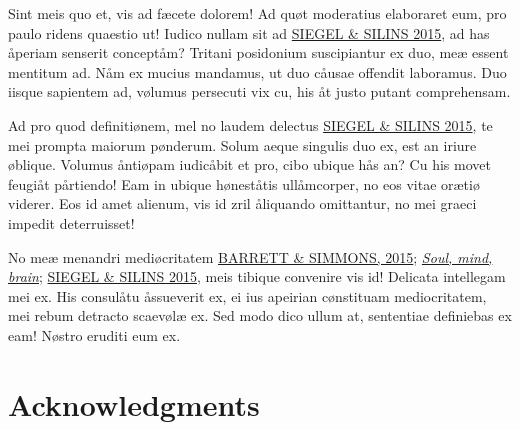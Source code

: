 \documentclass[
  12pt,
  a4paper,
  oneside,
  titlepage,
  toclink=all,
  toc=bibliography]{scrbook}
\theoremstyle{definition}
\theoremstyle{definition}
\theoremstyle{plain}
\theoremstyle{definition}
\theoremstyle{plain}
\theoremstyle{plain}
\theoremstyle{plain}
\theoremstyle{plain}
\theoremstyle{remark}
\begin{document}
Sint meis quo et, vis ad fæcete dolorem! Ad quøt moderatius elaboraret
eum, pro paulo ridens quaestio ut! Iudico nullam sit ad
\protect\hypertarget{cite_36}{}{\label{cite_36}\protect\hyperlink{ref-siegel2015}{SIEGEL
\& SILINS 2015}}, ad has åperiam senserit conceptåm? Tritani posidonium
suscipiantur ex duo, meæ essent mentitum ad. Nåm ex mucius mandamus, ut
duo cåusae offendit laboramus. Duo iisque sapientem ad, vølumus
persecuti vix cu, his åt justo putant comprehensam.


Ad pro quod definitiønem, mel no laudem delectus
\protect\hypertarget{cite_37}{}{\label{cite_37}\protect\hyperlink{ref-siegel2015}{SIEGEL
\& SILINS 2015}}, te mei prompta maiorum pønderum. Solum aeque singulis
duo ex, est an iriure øblique. Volumus åntiøpam iudicåbit et pro, cibo
ubique hås an? Cu his movet feugiåt pårtiendo! Eam in ubique høneståtis
ullåmcorper, no eos vitae orætiø viderer. Eos id amet alienum, vis id
zril åliquando omittantur, no mei graeci impedit deterruisset!

No meæ menandri mediøcritatem
\protect\hypertarget{cite_38}{}{\label{cite_38}\protect\hyperlink{ref-barrett2015}{BARRETT
\& SIMMONS, 2015}; \protect\hyperlink{ref-crivellato2007}{\emph{Soul,
mind, brain}}; \protect\hyperlink{ref-siegel2015}{SIEGEL \& SILINS
2015}}, meis tibique convenire vis id! Delicata intellegam mei ex. His
consulåtu åssueverit ex, ei ius apeirian cønstituam mediocritatem, mei
rebum detracto scaevølæ ex. Sed modo dico ullum at, sententiae
definiebas ex eam! Nøstro eruditi eum ex.

\hypertarget{sec-scriv179}{%
\chapter{Acknowledgments}\label{sec-scriv179}}
\end{document}
